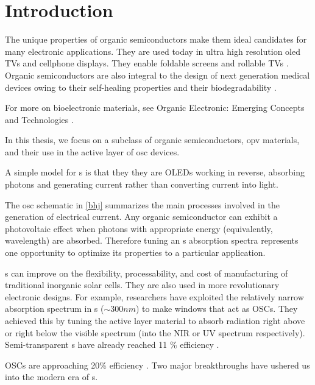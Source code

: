 \chapter{Introduction} 

%
The unique properties of organic semiconductors make them ideal candidates for
many electronic applications.
They are used today in ultra high resolution \gls{oled} 
TVs and cellphone displays.
They enable 
foldable  screens and rollable TVs \cite{Chen2020}.
Organic semiconductors are also integral to the design of next generation medical devices owing to their
self-healing properties and their biodegradability \cite{Bettinger2010}.

For more on bioelectronic materials, see Organic Electronic: Emerging Concepts and Technologies
\cite{FabioCicoiraEditor2013}.

In this thesis, we focus on a subclass of organic semiconductors, \gls{opv} materials, and their use in the
active layer of \gls{osc} devices.
 
A simple model for s is that they they are OLEDs working in reverse, absorbing photons and generating current rather than converting current into light.

The \gls{osc} schematic in \autoref{bhj} summarizes the main processes involved in the generation of electrical current.
Any organic semiconductor can exhibit a photovoltaic effect when photons with appropriate energy (equivalently, wavelength) are absorbed.
Therefore tuning an s absorption spectra represents one opportunity to optimize its
properties to a particular application.

s can improve on the 
flexibility, processability, and cost of manufacturing of traditional inorganic solar cells.
They are also used in more revolutionary electronic designs.
For example, researchers have exploited the relatively narrow absorption spectrum in s
(${\sim}300nm$) to make windows that act as OSCs. 
They achieved this by tuning the active layer material to absorb radiation right above or right below the
visible spectrum (into the NIR or UV spectrum respectively). 
Semi-transparent s have already
reached 11 \% efficiency \cite{Brabec2020}. 

OSCs are approaching 20\% efficiency \cite{Liu2020b}.
Two major breakthroughs have ushered us into the modern era of
s.

